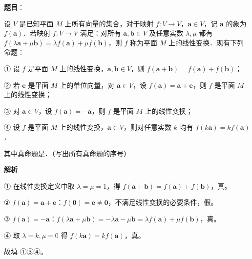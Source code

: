 \begin{answer}

\textbf{题目}：

设 $V$ 是已知平面 $M$ 上所有向量的集合，对于映射 $f:V\to V$，$\boldsymbol a\in V$，记 $\boldsymbol a$ 的象为 $f(\boldsymbol a)$．若映射 $f:V\to V$ 满足：对所有 $\boldsymbol a,\boldsymbol b\in V$ 及任意实数 $\lambda,\mu$ 都有 $f(\lambda\boldsymbol a+\mu\boldsymbol b)=\lambda f(\boldsymbol a)+\mu f(\boldsymbol b)$，则 $f$ 称为平面 $M$ 上的线性变换．现有下列命题：

① 设 $f$ 是平面 $M$ 上的线性变换，$\boldsymbol a,\boldsymbol b\in V$，则 $f(\boldsymbol a+\boldsymbol b)=f(\boldsymbol a)+f(\boldsymbol b)$；

② 若 $\boldsymbol e$ 是平面 $M$ 上的单位向量，对 $\boldsymbol a\in V$，设 $f(\boldsymbol a)=\boldsymbol a+\boldsymbol e$，则 $f$ 是平面 $M$ 上的线性变换；

③ 对 $\boldsymbol a\in V$，设 $f(\boldsymbol a)=-\boldsymbol a$，则 $f$ 是平面 $M$ 上的线性变换；

④ 设 $f$ 是平面 $M$ 上的线性变换，$\boldsymbol a\in V$，则对任意实数 $k$ 均有 $f(k\boldsymbol a)=kf(\boldsymbol a)$．

其中真命题是\gkblank{}．（写出所有真命题的序号）

\textbf{解析}

① 在线性变换定义中取 $\lambda=\mu=1$，得 $f(\boldsymbol a+\boldsymbol b)=f(\boldsymbol a)+f(\boldsymbol b)$，真。

② $f(\boldsymbol a)=\boldsymbol a+\boldsymbol e$：$f(\boldsymbol 0)=\boldsymbol e\neq\boldsymbol 0$，不满足线性变换的必要条件，假。

③ $f(\boldsymbol a)=-\boldsymbol a$：$f(\lambda\boldsymbol a+\mu\boldsymbol b)=-\lambda\boldsymbol a-\mu\boldsymbol b=\lambda f(\boldsymbol a)+\mu f(\boldsymbol b)$，真。

④ 取 $\lambda=k,\mu=0$ 得 $f(k\boldsymbol a)=kf(\boldsymbol a)$，真。

故填 ①③④。


\end{answer}
